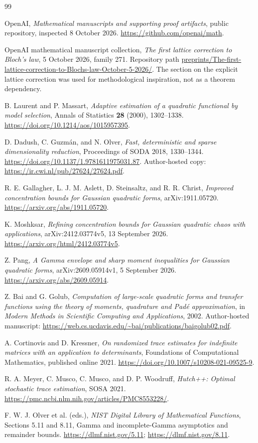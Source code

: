 \documentclass[11pt,letterpaper]{article}
\numberwithin{equation}{section}
\theoremstyle{definition}\newtheorem{definition}[theorem]{Definition}
\theoremstyle{remark}\newtheorem{remark}[theorem]{Remark}
\begin{document}
\begin{thebibliography}{99}
\raggedright
{} OpenAI, \emph{Mathematical manuscripts and supporting
proof artifacts}, public repository, inspected 8 October 2026.
\url{https://github.com/openai/math}.

 OpenAI mathematical manuscript collection,
\emph{The first lattice correction to Bloch's law}, 5 October 2026,
family 271. Repository path
\url{preprints/The-first-lattice-correction-to-Blochs-law-October-5-2026/}.
The section on the explicit lattice correction was used for
methodological inspiration, not as a theorem dependency.

 B. Laurent and P. Massart,
\emph{Adaptive estimation of a quadratic functional by model selection},
Annals of Statistics \textbf{28} (2000), 1302--1338.
\url{https://doi.org/10.1214/aos/1015957395}.

 D. Dadush, C. Guzm\'an, and N. Olver,
\emph{Fast, deterministic and sparse dimensionality reduction},
Proceedings of SODA 2018, 1330--1344.
\url{https://doi.org/10.1137/1.9781611975031.87}.
Author-hosted copy: \url{https://ir.cwi.nl/pub/27624/27624.pdf}.

 R. E. Gallagher, L. J. M. Aslett, D. Steinsaltz,
and R. R. Christ, \emph{Improved concentration bounds for Gaussian
quadratic forms}, arXiv:1911.05720.
\url{https://arxiv.org/abs/1911.05720}.

 K. Moshksar, \emph{Refining concentration bounds for
Gaussian quadratic chaos with applications}, arXiv:2412.03774v5,
13 September 2026. \url{https://arxiv.org/html/2412.03774v5}.

 Z. Pang, \emph{A Gamma envelope and sharp moment
inequalities for Gaussian quadratic forms}, arXiv:2609.05914v1,
5 September 2026. \url{https://arxiv.org/abs/2609.05914}.

 Z. Bai and G. Golub, \emph{Computation of large-scale
quadratic forms and transfer functions using the theory of moments,
quadrature and Pad\'e approximation}, in \emph{Modern Methods in
Scientific Computing and Applications}, 2002.
Author-hosted manuscript: \url{https://web.cs.ucdavis.edu/~bai/publications/baigolub02.pdf}.

 A. Cortinovis and D. Kressner,
\emph{On randomized trace estimates for indefinite matrices with an
application to determinants}, Foundations of Computational Mathematics,
published online 2021. \url{https://doi.org/10.1007/s10208-021-09525-9}.

 R. A. Meyer, C. Musco, C. Musco, and D. P. Woodruff,
\emph{Hutch++: Optimal stochastic trace estimation}, SOSA 2021.
\url{https://pmc.ncbi.nlm.nih.gov/articles/PMC8553228/}.

 F. W. J. Olver et al. (eds.),
\emph{NIST Digital Library of Mathematical Functions}, Sections 5.11
and 8.11, Gamma and incomplete-Gamma asymptotics and remainder bounds.
\url{https://dlmf.nist.gov/5.11}; \url{https://dlmf.nist.gov/8.11}.
\end{thebibliography}
\end{document}

